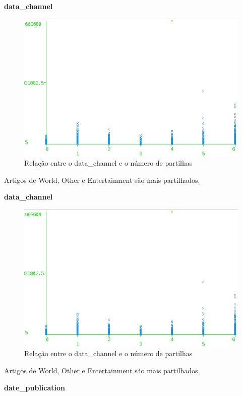 \textbf{data\_channel}

\begin{figure}[H]
    \centering
    \includegraphics[scale=0.6]{tex/img/graph7.jpg}
    \caption{Relação entre o data\_channel e o número de partilhas}
    \label{fig:dataChannel1}
\end{figure}

Artigos de World, Other e Entertainment são mais partilhados.

\textbf{data\_channel}

\begin{figure}[H]
    \centering
    \includegraphics[scale=0.6]{tex/img/graph7.jpg}
    \caption{Relação entre o data\_channel e o número de partilhas}
    \label{fig:dataChannel2}
\end{figure}

Artigos de World, Other e Entertainment são mais partilhados.


\textbf{date\_publication}

